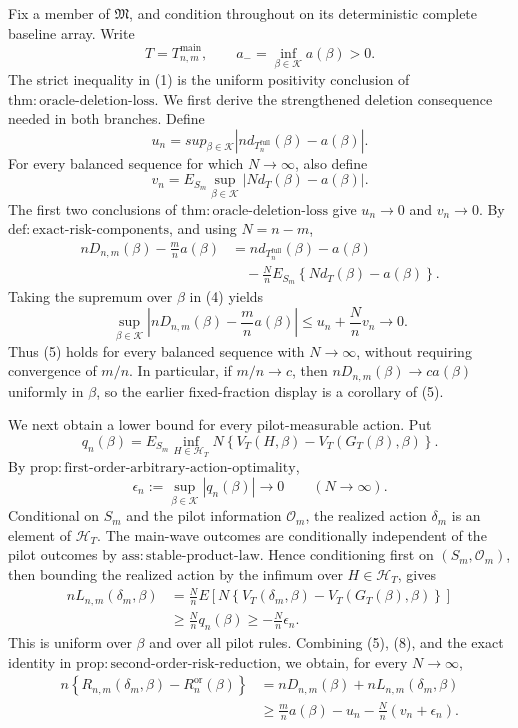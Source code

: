 Fix a member of \(\mathfrak M\), and condition throughout on its deterministic complete baseline array.  Write
\[
T=T_{n,m}^{\mathrm{main}},
\qquad
a_- = \inf_{\beta\in\mathcal K}a(\beta)>0.
\tag{1}
\]
The strict inequality in (1) is the uniform positivity conclusion of \(\mathrm{thm{:}oracle\text{-}deletion\text{-}loss}\).  We first derive the strengthened deletion consequence needed in both branches.  Define
\[
u_n=sup_{\beta\in\mathcal K}
\left|n d_{T_n^{\mathrm{full}}}(\beta)-a(\beta)\right|.
\tag{2}
\]
For every balanced sequence for which \(N\to\infty\), also define
\[
v_n=E_{S_m}\sup_{\beta\in\mathcal K}
\left|N d_T(\beta)-a(\beta)\right|.
\tag{3}
\]
The first two conclusions of \(\mathrm{thm{:}oracle\text{-}deletion\text{-}loss}\) give \(u_n\to0\) and \(v_n\to0\).  By \(\mathrm{def{:}exact\text{-}risk\text{-}components}\), and using \(N=n-m\),
\[
\begin{aligned}
nD_{n,m}(\beta)-\frac mn a(\beta)
&=n d_{T_n^{\mathrm{full}}}(\beta)-a(\beta)\\
&\quad-\frac Nn E_{S_m}
\left\{N d_T(\beta)-a(\beta)\right\}.
\end{aligned}
\tag{4}
\]
Taking the supremum over \(\beta\) in (4) yields
\[
\sup_{\beta\in\mathcal K}
\left|nD_{n,m}(\beta)-\frac mn a(\beta)\right|
\leq u_n+\frac Nn v_n
\longrightarrow0.
\tag{5}
\]
Thus (5) holds for every balanced sequence with \(N\to\infty\), without requiring convergence of \(m/n\).  In particular, if \(m/n\to c\), then \(nD_{n,m}(\beta)\to c a(\beta)\) uniformly in \(\beta\), so the earlier fixed-fraction display is a corollary of (5).

We next obtain a lower bound for every pilot-measurable action.  Put
\[
q_n(\beta)=E_{S_m}\inf_{H\in\mathcal H_T}
N\left\{V_T(H,\beta)-V_T(G_T(\beta),\beta)\right\}.
\tag{6}
\]
By \(\mathrm{prop{:}first\text{-}order\text{-}arbitrary\text{-}action\text{-}optimality}\),
\[
\epsilon_n:=\sup_{\beta\in\mathcal K}|q_n(\beta)|\longrightarrow0
\qquad (N\to\infty).
\tag{7}
\]
Conditional on \(S_m\) and the pilot information \(\mathcal O_m\), the realized action \(\delta_m\) is an element of \(\mathcal H_T\).  The main-wave outcomes are conditionally independent of the pilot outcomes by \(\mathrm{ass{:}stable\text{-}product\text{-}law}\).  Hence conditioning first on \((S_m,\mathcal O_m)\), then bounding the realized action by the infimum over \(H\in\mathcal H_T\), gives
\[
\begin{aligned}
nL_{n,m}(\delta_m,\beta)
&=\frac Nn E\!\left[
N\left\{V_T(\delta_m,\beta)
-V_T(G_T(\beta),\beta)\right\}
\right]\\
&\geq \frac Nn q_n(\beta)
\geq-\frac Nn\epsilon_n .
\end{aligned}
\tag{8}
\]
This is uniform over \(\beta\) and over all pilot rules.  Combining (5), (8), and the exact identity in \(\mathrm{prop{:}second\text{-}order\text{-}risk\text{-}reduction}\), we obtain, for every \(N\to\infty\),
\[
\begin{aligned}
n\left\{R_{n,m}(\delta_m,\beta)-R_n^{\mathrm{or}}(\beta)\right\}
&=nD_{n,m}(\beta)+nL_{n,m}(\delta_m,\beta)\\
&\geq \frac mn a(\beta)-u_n-\frac Nn(v_n+\epsilon_n).
\end{aligned}
\tag{9}
\]

